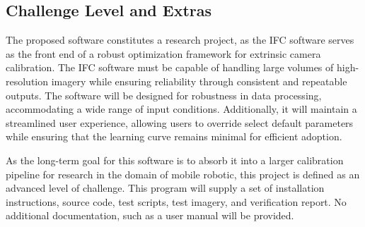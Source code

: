 \documentclass[12pt, titlepage]{article}
\begin{document}
\subsection{Challenge Level and Extras}
The proposed software constitutes a research project, as the IFC software serves as the front end of a robust optimization framework 
for extrinsic camera calibration. The IFC software must be capable of handling large volumes of high-resolution imagery while ensuring reliability through consistent and repeatable outputs. The software will be designed for robustness in data processing, accommodating a wide range of input conditions. Additionally, it will maintain a streamlined user experience, allowing users to override select default parameters while ensuring that the learning curve remains minimal for efficient adoption. 

As the long-term goal for this software is to absorb it into a larger calibration pipeline for research in the domain of mobile robotic, this project is defined as an advanced level of challenge. This program will supply a set of installation instructions, source code, test scripts, test imagery, and verification report. No additional documentation, such as a user manual will be provided.
\end{document}
